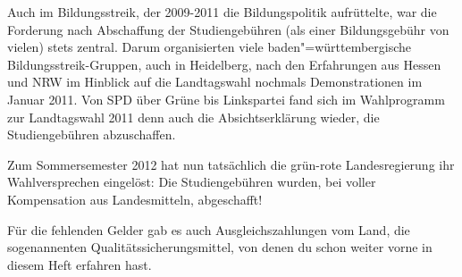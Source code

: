 Auch im Bildungsstreik, der 2009-2011 die Bildungspolitik aufrüttelte, war die
Forderung nach Abschaffung der Studiengebühren (als einer Bildungsgebühr von
vielen) stets zentral. Darum organisierten viele baden"=württembergische
Bildungsstreik-Gruppen, auch in Heidelberg, nach den Erfahrungen aus Hessen und
NRW im Hinblick auf die Landtagswahl nochmals Demonstrationen im Januar 2011.
Von SPD über Grüne bis Linkspartei fand sich im Wahlprogramm zur Landtagswahl
2011 denn auch die Absichtserklärung wieder, die Studiengebühren abzuschaffen.

Zum Sommersemester 2012 hat nun tatsächlich die grün-rote Landesregierung ihr
Wahlversprechen eingelöst: Die Studiengebühren wurden, bei voller Kompensation
aus Landesmitteln, abgeschafft!


Für die fehlenden Gelder gab es auch Ausgleichszahlungen vom Land, die
sogenannenten Qualitätssicherungsmittel, von denen du schon weiter vorne in
diesem Heft erfahren hast.
\fi
